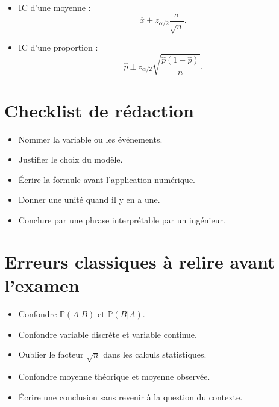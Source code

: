 \begin{itemize}
    \item IC d'une moyenne :
    $$
    \overline{x} \pm z_{\alpha/2}\frac{\sigma}{\sqrt{n}}.
    $$
    \item IC d'une proportion :
    $$
    \widehat{p} \pm z_{\alpha/2}\sqrt{\frac{\widehat{p}(1-\widehat{p})}{n}}.
    $$
\end{itemize}

\section{Checklist de rédaction}

\begin{itemize}
    \item Nommer la variable ou les événements.
    \item Justifier le choix du modèle.
    \item Écrire la formule avant l'application numérique.
    \item Donner une unité quand il y en a une.
    \item Conclure par une phrase interprétable par un ingénieur.
\end{itemize}

\section{Erreurs classiques à relire avant l'examen}

\begin{itemize}
    \item Confondre $\mathbb{P}(A|B)$ et $\mathbb{P}(B|A)$.
    \item Confondre variable discrète et variable continue.
    \item Oublier le facteur $\sqrt{n}$ dans les calculs statistiques.
    \item Confondre moyenne théorique et moyenne observée.
    \item Écrire une conclusion sans revenir à la question du contexte.
\end{itemize}
